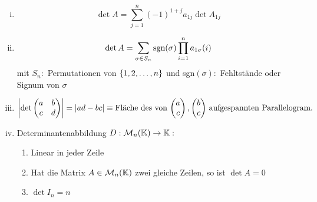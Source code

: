 \begin{theorem}\hfill\break
    \begin{enumerate}[(i)]
        \item \[
            \det A = \sum_{j=1}^n (-1)^{1+j}a_{1j}\det A_{1j}\]
        \item \[
            \det A = \sum_{\sigma\in S_n}\text{sgn}(\sigma)\prod_{i=1}^n a_{1\sigma}(i)\]
            mit $S_n :$ Permutationen von $\left\{ 1,2,\dots,n \right\}$ und sgn$(\sigma):$ 
            Fehltstände oder Signum von $\sigma$
        \item \[\left\vert \det\begin{pmatrix}a&b\\c&d\end{pmatrix} \right\vert = \left\vert ad-bc \right\vert\equiv\text{Fläche des 
        von $\begin{pmatrix}a\\c\end{pmatrix}, \begin{pmatrix}b\\c\end{pmatrix}$ aufgespannten Parallelogram.}\]
        \item Determinantenabbildung $
            D:\mathcal{M}_{n}(\mathbb{K}) \to \mathbb{K}:$\begin{enumerate}
                \item Linear in jeder Zeile
                \item Hat die Matrix $A\in \mathcal{M}_{n}(\mathbb{K})$ zwei gleiche Zeilen, so ist 
                $\det A = 0$
                \item $\det I_n = n$
            \end{enumerate}
    \end{enumerate}
\end{theorem}
